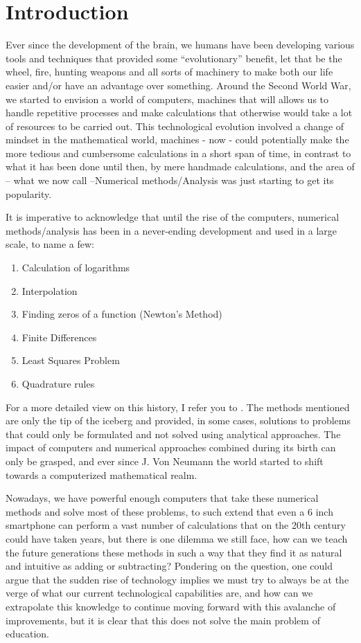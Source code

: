 \chapter{Introduction}

Ever since the development of the brain, we humans have been developing various tools and techniques that provided some “evolutionary” benefit, let that be the wheel, fire, hunting weapons and all sorts of machinery to make both our life easier and/or have an advantage over something. 
Around the Second World War, we started to envision a world of computers, machines that will allows us to handle repetitive processes and make calculations that otherwise would take a lot of resources to be carried out. This technological evolution involved a change of mindset in the mathematical world, machines - now - could potentially make the more tedious and cumbersome calculations in a short span of time, in contrast to what it has been done until then, by mere handmade calculations, and the area of – what we now call –Numerical methods/Analysis was just starting to get its popularity.


It is imperative to acknowledge that until the rise of the computers, numerical methods/analysis has been in a never-ending development and used in a large scale, to name a few:
\begin{enumerate}
    \item Calculation of logarithms
    \item Interpolation
    \item Finding zeros of a function (Newton's Method)
    \item Finite Differences
    \item Least Squares Problem
    \item Quadrature rules
\end{enumerate}

For a more detailed view on this history, I refer you to \cite{goldstine2012history}. The methods mentioned are only the tip of the iceberg and provided, in some cases, solutions to problems that could only be formulated and not solved using analytical approaches. 
The impact of computers and numerical approaches combined during its birth can only be grasped, and ever since J. Von Neumann the world started to shift towards a computerized mathematical realm.


Nowadays, we have powerful enough computers that take these numerical methods and solve most of these problems, to such extend that even a 6 inch smartphone can perform a vast number of calculations that on the 20th century could have taken years, but there is one dilemma we still face, how can we teach the future generations these methods in such a way that they find it as natural and intuitive as adding or subtracting? Pondering on the question, one could argue that the sudden rise of technology implies we must try to always be at the verge of what our current technological capabilities are, and how can we extrapolate this knowledge to continue moving forward with this avalanche of improvements, but it is clear that this does not solve the main problem of education.


